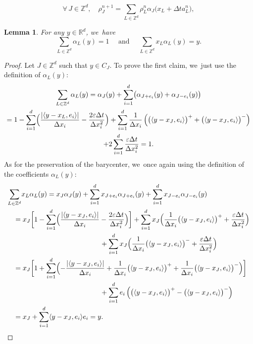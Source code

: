 \documentclass[JEP,XML,SOM,Unicode, NoFloatCountersInSection,published]{cedram}
\def\RR{\mathbb{R}}
\def\ZZ{\mathbb{Z}}
\def\eps{\varepsilon}
\def\dt{\Delta t}
\def\dx{\Delta x}
\theoremstyle{plain}
\newtheorem{lemma}[theorem]{Lemma}
\theoremstyle{definition}
\begin{document}
\begin{equation*}%
\forall\, J \in \ZZ^d, \quad
\rho^{n+1}_J = \sum_{L\in\ZZ^d} \rho^n_L \alpha_{J}\bigl(x_L+\dt a^n_L\bigr),
\end{equation*}
\begin{lemma}\label{lemma:alpha}
For any $y \in \RR^d$, we~have
\[
\sum_{L\in \ZZ^d} \alpha_{L}(y) = 1 \quad \mbox{ and } \quad \sum_{L\in \ZZ^d} x_L \alpha_{L}(y) = y.
\]
\end{lemma}
\begin{proof}
Let $J\in \ZZ^d$ such that $y\in C_J$. To prove the first claim, we~just use the definition of $\alpha_{L}(y)$:
\begin{multline*}
\sum_{L\in \ZZ^d} \alpha_{L}(y) = \alpha_{J}(y) + \sum_{i=1}^d \bigl(\alpha_{J+e_i}(y)+\alpha_{J-e_i}(y)\bigr)
\\
= 1 - \sum_{i=1}^d \Bigl(\frac{|\langle y-{x_L},e_i\rangle|}{\dx_i} - \frac{2\eps\dt}{\dx_i^2}\Bigr)
+ \sum_{i=1}^d \frac{1}{\dx_i} \left(\bigl(\langle y-x_{J},e_i\rangle \bigr)^+ + \bigl(\langle y-x_{J},e_i\rangle \bigr)^-\right) \\
+ 2 \sum_{i=1}^d \frac{\eps\dt}{\dx_i^2} = 1.
\end{multline*}
As for the preservation of the barycenter, we~once again using the definition of the coefficients $\alpha_{L}(y)$:
\begin{align*}
\sum_{L\in \ZZ^d}& x_L \alpha_{L}(y) = x_J \alpha_J(y) + \sum_{i=1}^d x_{J+e_i} \alpha_{J+e_i}(y)+ \sum_{i=1}^d x_{J-e_i} \alpha_{J-e_i}(y)
\\
&\hspace*{-4mm}= x_J \biggl[1-\sum_{i=1}^d \Bigl(\frac{|\langle y-{x_J},e_i\rangle|}{\dx_i} - \frac{2\eps\dt}{\dx_i^2}\Bigr)\biggr] + \sum_{i=1}^d x_{J} \Bigl(\frac{1}{\dx_i}\bigl(\langle y-x_{J},e_i\rangle\bigr)^+ + \frac{\eps\dt}{\dx_i^2}\Bigr) \\
&\hspace*{4cm}+ \sum_{i=1}^d x_{J} \Bigl(\frac{1}{\dx_i}\bigl(\langle y-x_{J},e_i\rangle\bigr)^- + \frac{\eps\dt}{\dx_i^2} \Bigr) \\
&\hspace*{-4mm}= x_J \biggl[1+\sum_{i=1}^d \Bigl(-\frac{|\langle y-{x_J},e_i\rangle|}{\dx_i} + \frac{1}{\dx_i}\bigl(\langle y-x_{J},e_i\rangle\bigr)^+ + \frac{1}{\dx_i}\bigl(\langle y-x_{J},e_i\rangle\bigr)^- \Bigr)\biggr] \\
&\hspace*{4cm}+ \sum_{i=1}^d e_i \left(\bigl(\langle y-x_J, e_i\rangle \bigr)^+ - \bigl(\langle y-x_J, e_i\rangle \bigr)^- \right) \\
&\hspace*{-4mm}= x_J + \sum_{i=1}^d \langle y-x_J, e_i\rangle e_i = y.\qedhere
\end{align*}
\end{proof}
\end{document}
